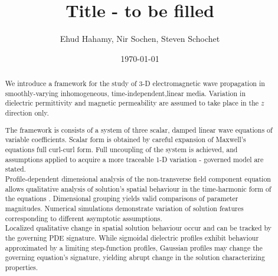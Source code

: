 \documentclass[twocolumn,secnumarabic,amssymb, nobibnotes, aps, prd]{revtex4-1}
\begin{document}
\title{Title - to be filled}%

\author{Ehud Hahamy, Nir Sochen, Steven Schochet}%
\date{\today}%
\begin{abstract}
We introduce a framework for the study of 3-D electromagnetic wave propagation in smoothly-varying inhomogeneous, time-independent,linear media. Variation in dielectric permittivity and magnetic permeability  are assumed to take place in the $z$ direction only.
 
The framework is consists of a system of three scalar, damped linear wave equations of variable coefficients. Scalar form is obtained by  careful expansion of Maxwell's equations full curl-curl form.  
Full uncoupling of the system is achieved, and assumptions applied to acquire a more traceable 1-D variation - governed model are stated.\\
Profile-dependent dimensional analysis of the non-transverse field component equation allows qualitative analysis of solution's spatial behaviour in the time-harmonic form of the equations .
Dimensional grouping yields valid comparisons of parameter magnitudes. Numerical simulations demonstrate variation of solution features corresponding to different asymptotic assumptions. \\
Localized qualitative change in spatial solution behaviour occur and can be tracked by the governing PDE signature. While sigmoidal dielectric profiles exhibit behaviour approximated by a limiting step-function profiles, Gaussian profiles may change the  governing equation's signature, yielding abrupt change in the solution characterizing properties.  

\end{abstract}
\maketitle
\end{document}
